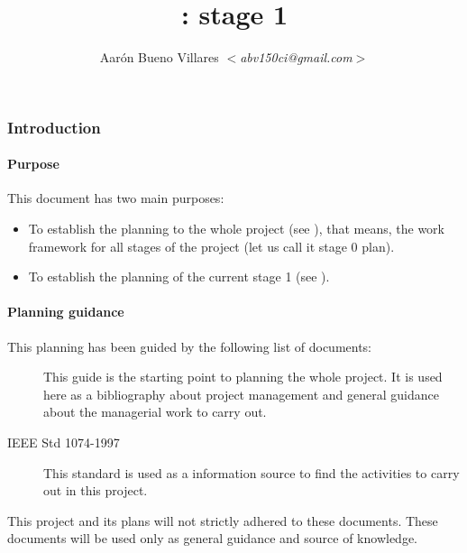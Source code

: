 \documentclass[twocolumn, 9pt]{extarticle}
\title{\fav: \favpl stage 1}
\author{Aarón Bueno Villares \textit{$<$abv150ci@gmail.com$>$}}
\begin{document}
\twocolumn[
  \maketitle
]

\tableofcontents
\listoffigures
\listoftables

\section{Introduction}
\subsection{Purpose}
This document has two main purposes:

\begin{itemize}
\item To establish the planning to the whole project (see
  ), that means, the work framework for all
  stages of the project (let us call it stage 0 plan).
\item To establish the planning of the current stage 1 (see
  ).
\end{itemize}

\subsection{Planning guidance}
This planning has been guided by the following list of documents:

\begin{description}
  \item[\pmbok] This guide is the starting point to planning the
    whole project. It is used here as a bibliography about project
    management and general guidance about the managerial work to carry
    out.
  \item[IEEE Std 1074-1997] This standard is used as a information
    source to find the activities to carry out in this project.
\end{description}

This project and its plans will not strictly adhered to these
documents. These documents will be used only as general guidance and
source of knowledge.

\part{\favpl}
\label{part:st0-plan}

\end{document}
